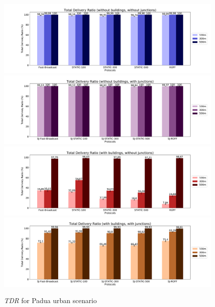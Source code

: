 		\begin{figure}[H]
			\centering
			\includegraphics[width=1.0\textwidth]{immagini/padua-25/b0/j0/tdr}
			\includegraphics[width=1.0\textwidth]{immagini/padua-25/b0/j1/tdr}
			\includegraphics[width=1.0\textwidth]{immagini/padua-25/b1/j0/tdr}
			\includegraphics[width=1.0\textwidth]{immagini/padua-25/b1/j1/tdr}
			\caption{\textit{TDR} for Padua urban scenario}
			\label{fig:padua-25-tdr}
		\end{figure}
		
